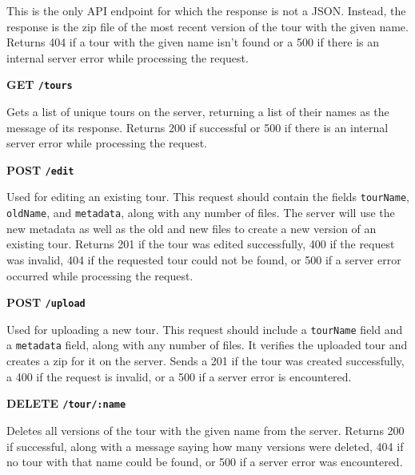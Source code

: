 \documentclass[a4paper, 10pt, american, titlepage]{article}
\newenvironment{indented}[1]%
{\begin{list}{}%
	{\setlength{\leftmargin}{#1}}%
	\item[]%
}
{\end{list}}
\begin{document}
\begin{indented}{1cm}
	This is the only API endpoint for which the response is not a JSON. Instead,
	the response is the zip file of the most recent version of the tour with the
	given name. Returns 404 if a tour with the given name isn't found or a 500
	if there is an internal server error while processing the request.
\end{indented}

\noindent\textbf{GET \texttt{/tours}}

\begin{indented}{1cm}
	Gets a list of unique tours on the server, returning a list of their names
	as the message of its response. Returns 200 if successful or 500 if there is
	an internal server error while processing the request.
\end{indented}

\noindent\textbf{POST \texttt{/edit}}

\begin{indented}{1cm}
	Used for editing an existing tour. This request should contain the fields
	\texttt{tourName}, \texttt{oldName}, and \texttt{metadata}, along with any
	number of files.  The server will use the new metadata as well as the old
	and new files to create a new version of an existing tour. Returns 201 if
	the tour was edited successfully, 400 if the request was invalid, 404 if the
	requested tour could not be found, or 500 if a server error occurred while
	processing the request.
\end{indented}

\noindent\textbf{POST \texttt{/upload}}

\begin{indented}{1cm}
	Used for uploading a new tour. This request should include a
	\texttt{tourName} field and a \texttt{metadata} field, along with any number
	of files. It verifies the uploaded tour and creates a zip for it on the
	server. Sends a 201 if the tour was created successfully, a 400 if the
	request is invalid, or a 500 if a server error is encountered.
\end{indented}

\noindent\textbf{DELETE \texttt{/tour/:name}}

\begin{indented}{1cm}
	Deletes all versions of the tour with the given name from the server.
	Returns 200 if successful, along with a message saying how many versions
	were deleted, 404 if no tour with that name could be found, or 500 if a
	server error was encountered.
\end{indented}
\end{document}
